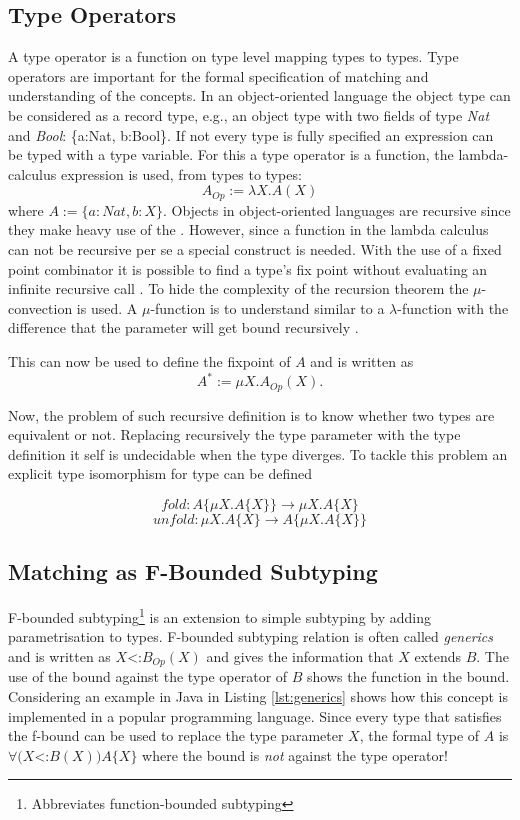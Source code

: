\subsection{Type Operators}
A type operator is a function on type level mapping types to types. Type
operators are important for the formal specification of matching and
understanding of the concepts. In an object-oriented language the object
type can be considered as a record type, e.g., an object type with two
fields of type \emph{Nat} and \emph{Bool}: \{a:Nat, b:Bool\}. If not
every type is fully specified an expression can be typed with a type
variable. For this a type operator is a function, the lambda-calculus
expression is used, from types to types: \[A_{Op} := \lambda X.A(X)
\] where $A := \{a:Nat, b:X\}$. Objects in object-oriented languages
are recursive since they make heavy use of the \mytype. However,
since a function in the lambda calculus can not be recursive
per se a special construct is needed. With the use of a fixed
point combinator it is possible to find a type's fix point without
evaluating an infinite recursive call \cite{gabriel_why_1988}. To
hide the complexity of the recursion theorem the $\mu$-convection is
used. A $\mu$-function is to understand similar to a $\lambda$-function
with the difference that the parameter will get bound recursively
\cite{pierce_types_2002,simons_theory_2002-3}.

This can now be used to define the fixpoint of $A$ and is written as \[A^*
:= \mu X.A_{Op}(X).\]

Now, the problem of such recursive definition is to know whether two
types are equivalent or not. Replacing recursively the type parameter with
the type definition it self is undecidable when the type diverges. To tackle
this problem an explicit type isomorphism for type can be defined \cite{abadi_subtyping_1996}

\begin{defn}
	\label{def:foldUnfold}
	\[fold : A\{\mu X.A\{X\}\} \rightarrow \mu X.A\{X\}\]
	\[unfold : \mu X.A\{X\} \rightarrow A\{\mu X.A\{X\}\}\]
\end{defn}

\subsection{Matching as F-Bounded Subtyping}
F-bounded subtyping\footnote{Abbreviates function-bounded subtyping}
is an extension to simple subtyping by adding parametrisation to
types. F-bounded subtyping relation is often called \emph{generics}
and is written as $X$<:$B_{Op}(X)$ and gives the information that $X$
extends $B$. The use of the bound against the type operator of $B$
shows the function in the bound. Considering an example in Java in
Listing \ref{lst:generics} shows how this concept is implemented in a popular
programming language. Since every type that satisfies the f-bound can
be used to replace the type parameter $X$, the formal type of $A$ is
$\forall(X$<:$B(X))A\{X\}$ where the bound is \emph{not} against the
type operator!

